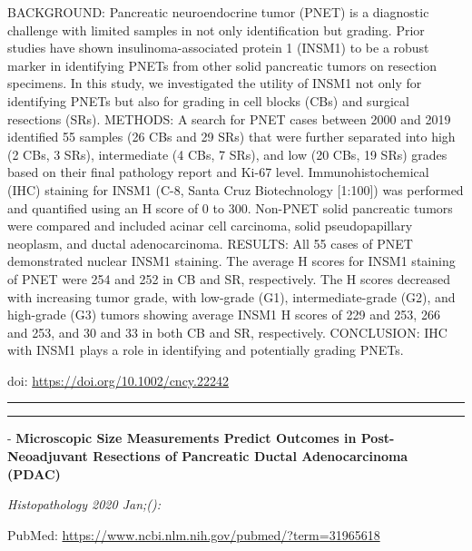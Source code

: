 \documentclass[
]{article}
\begin{document}
BACKGROUND: Pancreatic neuroendocrine tumor (PNET) is a diagnostic
challenge with limited samples in not only identification but grading.
Prior studies have shown insulinoma-associated protein 1 (INSM1) to be a
robust marker in identifying PNETs from other solid pancreatic tumors on
resection specimens. In this study, we investigated the utility of INSM1
not only for identifying PNETs but also for grading in cell blocks (CBs)
and surgical resections (SRs). METHODS: A search for PNET cases between
2000 and 2019 identified 55 samples (26 CBs and 29 SRs) that were
further separated into high (2 CBs, 3 SRs), intermediate (4 CBs, 7 SRs),
and low (20 CBs, 19 SRs) grades based on their final pathology report
and Ki-67 level. Immunohistochemical (IHC) staining for INSM1 (C-8,
Santa Cruz Biotechnology {[}1:100{]}) was performed and quantified using
an H score of 0 to 300. Non-PNET solid pancreatic tumors were compared
and included acinar cell carcinoma, solid pseudopapillary neoplasm, and
ductal adenocarcinoma. RESULTS: All 55 cases of PNET demonstrated
nuclear INSM1 staining. The average H scores for INSM1 staining of PNET
were 254 and 252 in CB and SR, respectively. The H scores decreased with
increasing tumor grade, with low-grade (G1), intermediate-grade (G2),
and high-grade (G3) tumors showing average INSM1 H scores of 229 and
253, 266 and 253, and 30 and 33 in both CB and SR, respectively.
CONCLUSION: IHC with INSM1 plays a role in identifying and potentially
grading PNETs.

doi: \url{https://doi.org/10.1002/cncy.22242}

\begin{center}\rule{0.5\linewidth}{0.5pt}\end{center}

\begin{center}\rule{0.5\linewidth}{0.5pt}\end{center}

- \textbf{Microscopic Size Measurements Predict Outcomes in
Post-Neoadjuvant Resections of Pancreatic Ductal Adenocarcinoma (PDAC)}

\emph{Histopathology 2020 Jan;():}

PubMed: \url{https://www.ncbi.nlm.nih.gov/pubmed/?term=31965618}
\end{document}
